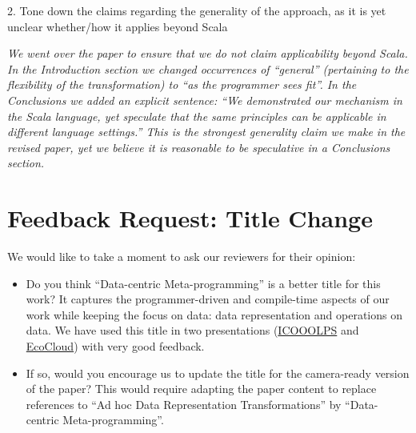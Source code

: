 \documentclass[9pt]{article}
\newenvironment{editorial}
{ \color{Red} \framebox{{\bf REVISION}} }
{  }
\newenvironment{answer}
{ \em \framebox{{\bf AUTHOR RESPONSE}} }
{  }
\begin{document}
\begin{editorial}
2. Tone down the claims regarding the generality of the approach, as it is yet unclear whether/how it applies beyond Scala
\end{editorial}

\begin{answer}
We went over the paper to ensure that we do not claim applicability beyond Scala. In the Introduction section we changed occurrences of ``general'' (pertaining to the flexibility of the transformation) to ``as the programmer sees fit''. In the Conclusions we added an explicit sentence: ``We demonstrated our mechanism in the Scala language, yet speculate that the same principles can be applicable in different language settings.'' This is the strongest generality claim we make in the revised paper, yet we believe it is reasonable to be speculative in a Conclusions section.
\end{answer}





\section{Feedback Request: Title Change}

We would like to take a moment to ask our reviewers for their opinion:

\begin{itemize}
  \item Do you think ``Data-centric Meta-programming'' is a better title for this work? It captures the programmer-driven and compile-time aspects of our work while keeping the focus on data: data representation and operations on data. We have used this title in two presentations (\href{https://speakerdeck.com/vladureche/data-centric-metaprogramming-at-icooolps-2015}{ICOOOLPS} and \href{https://speakerdeck.com/vladureche/data-centric-metaprogramming-at-ecocloud-2015}{EcoCloud}) with very good feedback.
  \item If so, would you encourage us to update the title for the camera-ready version of the paper? This would require adapting the paper content to replace references to ``Ad hoc Data Representation Transformations'' by ``Data-centric Meta-programming''.
\end{itemize}
\end{document}
